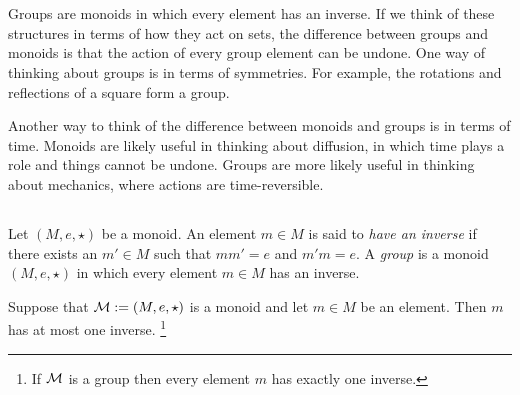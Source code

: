\documentclass[CT4S-EN-RU]{subfiles}
\begin{document}
\section{}\label{sec:groups}

\begin{blockENG}
Groups are monoids in which every element has an inverse. If we think of these structures in terms of how they act on sets, the difference between groups and monoids is that the action of every group element can be undone. One way of thinking about groups is in terms of symmetries. For example, the rotations and reflections of a square form a group. 
\end{blockENG}

\begin{blockRUS}
\end{blockRUS}

\begin{blockENG}
Another way to think of the difference between monoids and groups is in terms of time. Monoids are likely useful in thinking about diffusion, in which time plays a role and things cannot be undone. Groups are more likely useful in thinking about mechanics, where actions are time-reversible. 
\end{blockENG}

\begin{blockRUS}
\end{blockRUS}


\subsection{}

\begin{definitionENG}\label{def:group}
Let $(M,e,\star)$ be a monoid. An element $m\in M$ is said to {\em have an inverse} if there exists an $m'\in M$ such that $mm'=e$ and $m'm=e.$ A {\em group} is a monoid $(M,e,\star)$ in which every element $m\in M$ has an inverse.
\end{definitionENG}

\begin{definitionRUS}\label{def:group}
\end{definitionRUS}

\begin{propositionENG}
Suppose that $\mathcal{M}:=(M,e,\star)$ is a monoid and let $m\in M$ be an element. Then $m$ has at most one inverse.
\footnote{If $\mathcal{M}$ is a group then every element $m$ has exactly one inverse.}
\end{propositionENG}
\end{document}
